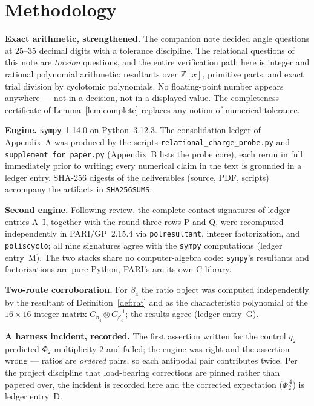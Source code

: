 \documentclass[11pt]{article}
\theoremstyle{plain}
\theoremstyle{definition}
\theoremstyle{remark}
\newcommand{\Z}{\mathbb{Z}}
\begin{document}
\section{Methodology}\label{sec:method}

\textbf{Exact arithmetic, strengthened.} The companion note decided angle
questions at $25$--$35$ decimal digits with a tolerance discipline. The
relational questions of this note are \emph{torsion} questions, and the entire
verification path here is integer and rational polynomial arithmetic: resultants
over $\Z[x]$, primitive parts, and exact trial division by cyclotomic
polynomials. No floating-point number appears anywhere --- not in a decision,
not in a displayed value. The completeness certificate of
Lemma~\ref{lem:complete} replaces any notion of numerical tolerance.

\textbf{Engine.} \texttt{sympy}~1.14.0 on Python~3.12.3. The consolidation
ledger of Appendix~A was produced by the scripts
\texttt{relational\_charge\_probe.py} and \texttt{supplement\_for\_paper.py}
(Appendix~B lists the probe core), each rerun in full immediately prior to
writing; every numerical claim in the text is grounded in a ledger entry. SHA-256
digests of the deliverables (source, PDF, scripts) accompany the artifacts
in \texttt{SHA256SUMS}.

\textbf{Second engine.} Following review, the complete contact signatures
of ledger entries A--I, together with the round-three rows P and Q, were
recomputed independently in PARI/GP~2.15.4 via
\texttt{polresultant}, integer factorization, and \texttt{poliscyclo}; all
nine signatures agree with the \texttt{sympy} computations (ledger
entry~M). The two stacks share no computer-algebra code: \texttt{sympy}'s
resultants and factorizations are pure Python, PARI's are its own C library.

\textbf{Two-route corroboration.} For $\beta_4$ the ratio object was computed
independently by the resultant of Definition~\ref{def:rat} and as the
characteristic polynomial of the $16\times16$ integer matrix
$C_{\beta_4}\otimes C_{\beta_4}^{-1}$; the results agree (ledger entry~G).

\textbf{A harness incident, recorded.} The first assertion written for the
control $q_2$ predicted $\Phi_2$-multiplicity $2$ and failed; the engine was
right and the assertion wrong --- ratios are \emph{ordered} pairs, so each
antipodal pair contributes twice. Per the project discipline that load-bearing
corrections are pinned rather than papered over, the incident is recorded here
and the corrected expectation ($\Phi_2^{\,4}$) is ledger entry~D.
\end{document}

